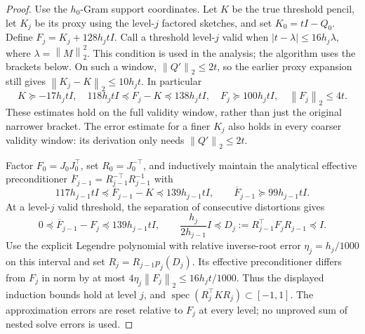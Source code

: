 \documentclass[11pt]{article}
\newcommand{\norm}[1]{\left\lVert#1\right\rVert}
\begin{document}
\begin{proof}
Use the \(h_0\)-Gram support coordinates. Let \(K\) be the true
threshold pencil, let \(K_j\) be its proxy using the level-\(j\)
factored sketches, and set \(K_0=tI-Q_0\). Define
\(F_j=K_j+128h_jtI\).
Call a threshold level-\(j\) valid when
\(\lvert t-\lambda\rvert\leq16h_j\lambda\), where
\(\lambda=\norm M_2^2\). This condition is used in the analysis; the
algorithm uses the brackets below.
On such a window, \(\norm{Q'}_2\leq2t\), so the earlier proxy
expansion still gives \(\norm{K_j-K}_2\leq10h_jt\). In particular
\[
 K\succeq-17h_jtI,\quad
 118h_jtI\preceq F_j-K\preceq138h_jtI,\quad
 F_j\succeq100h_jtI,\quad \norm{F_j}_2\leq4t.
\]
These estimates hold on the full validity window, rather than just
the original narrower bracket.
The error estimate for a finer \(K_j\) also holds in every coarser
validity window: its derivation only needs \(\norm{Q'}_2\leq2t\).

Factor \(F_0=J_0J_0^\top\), set \(R_0=J_0^{-\top}\), and
inductively maintain the analytical effective preconditioner
\(\overline F_{j-1}=R_{j-1}^{-\top}R_{j-1}^{-1}\) with
\[
 117h_{j-1}tI\preceq\overline F_{j-1}-K
                      \preceq139h_{j-1}tI,\qquad
 \overline F_{j-1}\succeq99h_{j-1}tI .
\]
At a level-\(j\) valid threshold, the separation of consecutive
distortions gives
\[
 0\preceq\overline F_{j-1}-F_j\preceq139h_{j-1}tI,\qquad
 \frac{h_j}{2h_{j-1}}I\preceq
       D_j:=R_{j-1}^\top F_jR_{j-1}\preceq I.
\]
Use the explicit Legendre polynomial with relative inverse-root error
\(\eta_j=h_j/1000\) on this interval and set
\(R_j=R_{j-1}p_j(D_j)\).
Its effective preconditioner differs from \(F_j\) in norm by at most
\(4\eta_j\norm{F_j}_2\leq16h_jt/1000\).
Thus the displayed induction bounds hold at level \(j\), and
\(\operatorname{spec}(R_j^\top K R_j)\subset[-1,1]\).
The approximation errors are reset relative to \(F_j\) at every
level; no unproved sum of nested solve errors is used.


\end{proof}
\end{document}
